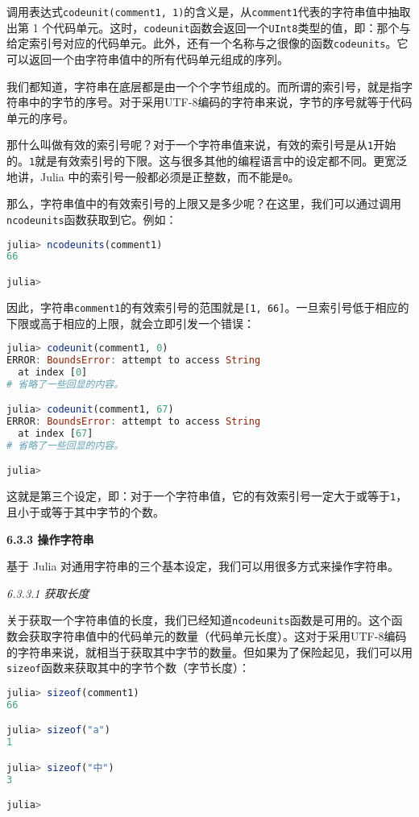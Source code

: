 调用表达式\verb|codeunit(comment1, 1)|的含义是，从\verb|comment1|代表的字符串值中抽取出第 1 个代码单元。这时，\verb|codeunit|函数会返回一个\verb|UInt8|类型的值，即：那个与给定索引号对应的代码单元。此外，还有一个名称与之很像的函数\verb|codeunits|。它可以返回一个由字符串值中的所有代码单元组成的序列。

我们都知道，字符串在底层都是由一个个字节组成的。而所谓的索引号，就是指字符串中的字节的序号。对于采用UTF-8编码的字符串来说，字节的序号就等于代码单元的序号。

那什么叫做有效的索引号呢？对于一个字符串值来说，有效的索引号是从\verb|1|开始的。\verb|1|就是有效索引号的下限。这与很多其他的编程语言中的设定都不同。更宽泛地讲，Julia 中的索引号一般都必须是正整数，而不能是\verb|0|。

那么，字符串值中的有效索引号的上限又是多少呢？在这里，我们可以通过调用\verb|ncodeunits|函数获取到它。例如：
\begin{lstlisting}[language=julia]
julia> ncodeunits(comment1)
66

julia> 
\end{lstlisting}

因此，字符串\verb|comment1|的有效索引号的范围就是\verb|[1, 66]|。一旦索引号低于相应的下限或高于相应的上限，就会立即引发一个错误：
\begin{lstlisting}[language=julia]
julia> codeunit(comment1, 0)
ERROR: BoundsError: attempt to access String
  at index [0]
# 省略了一些回显的内容。

julia> codeunit(comment1, 67)
ERROR: BoundsError: attempt to access String
  at index [67]
# 省略了一些回显的内容。

julia> 
\end{lstlisting}

这就是第三个设定，即：对于一个字符串值，它的有效索引号一定大于或等于\verb|1|，且小于或等于其中字节的个数。

\textbf{6.3.3 操作字符串}

基于 Julia 对通用字符串的三个基本设定，我们可以用很多方式来操作字符串。

\textsl{6.3.3.1 获取长度}

关于获取一个字符串值的长度，我们已经知道\verb|ncodeunits|函数是可用的。这个函数会获取字符串值中的代码单元的数量（代码单元长度）。这对于采用UTF-8编码的字符串来说，就相当于获取其中字节的数量。但如果为了保险起见，我们可以用\verb|sizeof|函数来获取其中的字节个数（字节长度）：
\begin{lstlisting}[language=julia]
julia> sizeof(comment1)
66

julia> sizeof("a")
1

julia> sizeof("中")
3

julia> 
\end{lstlisting}

